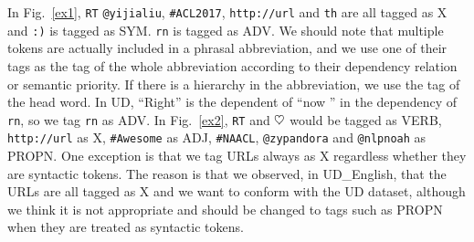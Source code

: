 \documentclass[11pt,letterpaper]{article}
\newcommand{\heart}{\ensuremath\heartsuit}
\begin{document}
In Fig.~\ref{ex1}, {\tt RT} {\tt @yijialiu}, {\tt \#ACL2017}, {\tt http://url} and {\tt th} are all tagged as X and {\tt :)} is tagged as SYM. 
{\tt rn} is tagged as ADV.
We should note that multiple tokens are actually included in a phrasal abbreviation, and we use one of their tags as the tag of the whole abbreviation according to their dependency relation or semantic priority.
If there is a hierarchy in the abbreviation, we use the tag of the head word. In UD, ``Right'' is the dependent of ``now '' in the dependency of {\tt rn}, so we tag {\tt rn} as ADV. 
In Fig.~\ref{ex2}, {\tt RT} and {\tt $\heart$} would be tagged as VERB, {\tt http://url} as X, {\tt \#Awesome} as ADJ, {\tt \#NAACL}, {\tt @zypandora} and {\tt @nlpnoah} as PROPN. One exception is that we tag URLs always as X regardless whether they are syntactic tokens. The reason is that we observed, in UD\_English, that the URLs are all tagged as X and we want to conform with the UD dataset, although we think it is not appropriate and should be changed to tags such as PROPN when they are treated as syntactic tokens.
\end{document}

